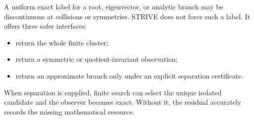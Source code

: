 A uniform exact label for a root, eigenvector, or analytic branch may be
discontinuous at collisions or symmetries.  STRIVE does not force such a label.
It offers three safer interfaces:

\begin{itemize}
\item return the whole finite cluster;
\item return a symmetric or quotient-invariant observation;
\item return an approximate branch only under an explicit separation
certificate.
\end{itemize}

When separation is supplied, finite search can select the unique isolated
candidate and the observer becomes exact.  Without it, the residual accurately
records the missing mathematical resource.
